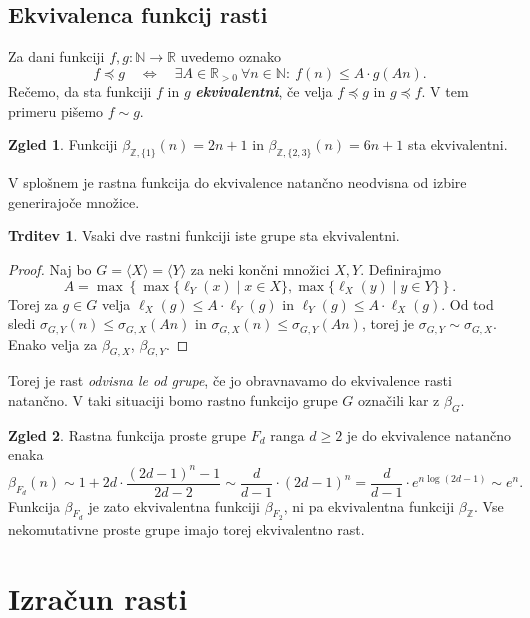 \documentclass[11pt]{book}
\def\NN{\mathbb{N}}
\def\ZZ{\mathbb{Z}}
\def\RR{\mathbb{R}}
\def\definicija{\color{rdeca}\bf\em}
\theoremstyle{definition}
\theoremstyle{zgled}
\newtheorem*{zgled}{Zgled}
\theoremstyle{odprtproblem}
\theoremstyle{domacanaloga}
\newenvironment{dokaz}
    {\color{siva}\begin{proof}}
    {\end{proof}}
\theoremstyle{izrek}
\newtheorem*{trditev}{Trditev}
\begin{document}
\subsection{Ekvivalenca funkcij rasti}

Za dani funkciji $f,g \colon \NN \to \RR$ uvedemo oznako
\[
f \preceq g \quad \Leftrightarrow \quad \exists A \in \RR_{> 0} \ \forall n \in \NN \colon \ f(n) \leq A \cdot g(An).
\]
Rečemo, da sta funkciji $f$ in $g$ {\definicija ekvivalentni}, če velja $f \preceq g$ in $g \preceq f$. V tem primeru pišemo $f \sim g$.

\begin{zgled}
Funkciji $\beta_{\ZZ, \{ 1 \}}(n) = 2n + 1$ in $\beta_{\ZZ, \{ 2, 3 \}}(n) = 6n+1$ sta ekvivalentni.
\end{zgled}

V splošnem je rastna funkcija do ekvivalence natančno neodvisna od izbire generirajoče množice.

\begin{trditev}
Vsaki dve rastni funkciji iste grupe sta ekvivalentni.
\end{trditev}

\begin{dokaz}
Naj bo $G = \langle X \rangle = \langle Y \rangle$ za neki končni množici $X, Y$. Definirajmo
\[
A = \max \left\{ \max \{ \ell_Y(x) \mid x \in X \}, \max \{ \ell_X(y) \mid y \in Y \} \right\}.
\]
Torej za $g \in G$ velja $\ell_X(g) \leq A \cdot \ell_Y(g)$ in $\ell_Y(g) \leq A \cdot \ell_X(g)$. Od tod sledi $\sigma_{G, Y}(n) \leq \sigma_{G,X}(An)$ in $\sigma_{G,X}(n) \leq \sigma_{G,Y}(An)$, torej je $\sigma_{G,Y} \sim \sigma_{G,X}$. Enako velja za $\beta_{G,X}$, $\beta_{G,Y}$.
\end{dokaz}

Torej je rast {\em odvisna le od grupe}, če jo obravnavamo do ekvivalence rasti natančno. V taki situaciji bomo rastno funkcijo grupe $G$ označili kar z $\beta_G$.

\begin{zgled}
Rastna funkcija proste grupe $F_d$ ranga $d \geq 2$ je do ekvivalence natančno enaka
\[
\beta_{F_d}(n) \sim 1 + 2d \cdot \frac{(2d-1)^n - 1}{2d-2} \sim 
\frac{d}{d-1} \cdot (2d-1)^n = \frac{d}{d-1} \cdot e^{n \log(2d-1)}
\sim e^n.
\]
Funkcija $\beta_{F_d}$ je zato ekvivalentna funkciji $\beta_{F_2}$, ni pa ekvivalentna funkciji $\beta_{\ZZ}$. Vse nekomutativne proste grupe imajo torej ekvivalentno rast.
\end{zgled}

\section{Izračun rasti}
\end{document}
